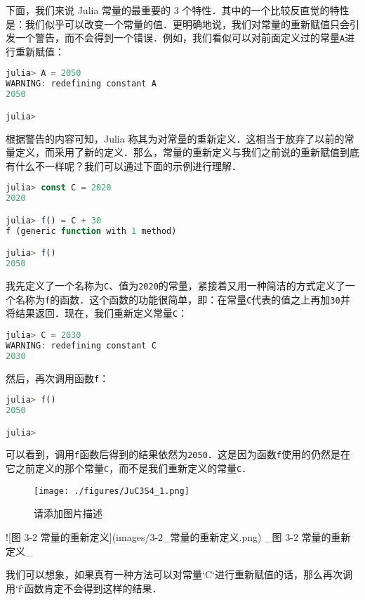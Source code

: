 下面，我们来说 Julia 常量的最重要的 3 个特性．其中的一个比较反直觉的特性是：我们似乎可以改变一个常量的值．更明确地说，我们对常量的重新赋值只会引发一个警告，而不会得到一个错误．例如，我们看似可以对前面定义过的常量\verb|A|进行重新赋值：

\begin{lstlisting}[language=julia]
julia> A = 2050
WARNING: redefining constant A
2050

julia> 
\end{lstlisting}

根据警告的内容可知，Julia 称其为对常量的重新定义．这相当于放弃了以前的常量定义，而采用了新的定义．那么，常量的重新定义与我们之前说的重新赋值到底有什么不一样呢？我们可以通过下面的示例进行理解．

\begin{lstlisting}[language=julia]
julia> const C = 2020 
2020

julia> f() = C + 30
f (generic function with 1 method)

julia> f()
2050
\end{lstlisting}

我先定义了一个名称为\verb|C|、值为\verb|2020|的常量，紧接着又用一种简洁的方式定义了一个名称为\verb|f|的函数．这个函数的功能很简单，即：在常量\verb|C|代表的值之上再加\verb|30|并将结果返回．现在，我们重新定义常量\verb|C|：

\begin{lstlisting}[language=julia]
julia> C = 2030
WARNING: redefining constant C
2030
\end{lstlisting}

然后，再次调用函数\verb|f|：

\begin{lstlisting}[language=julia]
julia> f()
2050

julia> 
\end{lstlisting}

可以看到，调用\verb|f|函数后得到的结果依然为\verb|2050|．这是因为函数\verb|f|使用的仍然是在它之前定义的那个常量\verb|C|，而不是我们重新定义的常量\verb|C|．

\begin{figure}[ht]
\centering
\texttt{[image: ./figures/JuC3S4\_1.png]}
\caption{请添加图片描述} \label{JuC3S4_fig1}
\end{figure}

![图 3-2 常量的重新定义](images/3-2_常量的重新定义.png)
_图 3-2 常量的重新定义_

我们可以想象，如果真有一种方法可以对常量`C`进行重新赋值的话，那么再次调用`f`函数肯定不会得到这样的结果．

